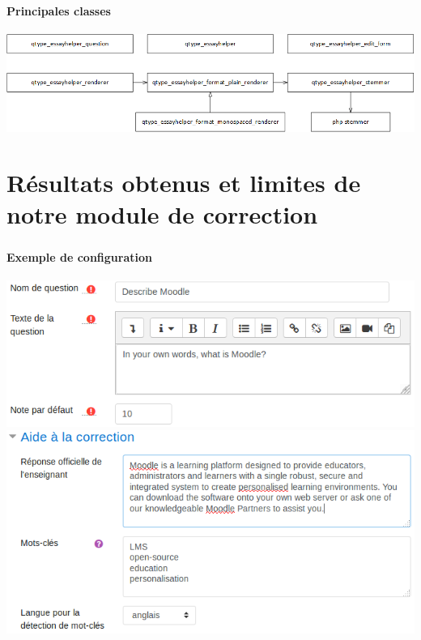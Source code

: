 \documentclass{beamer}
\begin{document}
  \begin{frame}
  \frametitle{\insertsection}
  \framesubtitle{Principales classes}
  \begin{center}
    \includegraphics[scale=0.4]{../images/class-simple.png}
  \end{center}
  \end{frame}
  \section[R\'esultats]{R\'esultats obtenus et limites de notre module de correction}
  \begin{frame}
  \frametitle{\insertsection}
  \framesubtitle{Exemple de configuration}
  \begin{center}
    \includegraphics[scale=0.4]{../images/questionform_base.png}
    \includegraphics[scale=0.4]{../images/questionform_helper.png}
  \end{center}
  \end{frame}
  
\end{document}
